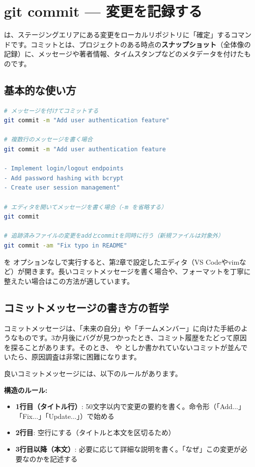 \section{git commit — 変更を記録する}

 は、ステージングエリアにある変更をローカルリポジトリに「確定」するコマンドです。コミットとは、プロジェクトのある時点の\textbf{スナップショット}（全体像の記録）に、メッセージや著者情報、タイムスタンプなどのメタデータを付けたものです。

\subsection{基本的な使い方}

\begin{lstlisting}[language=bash]
# メッセージを付けてコミットする
git commit -m "Add user authentication feature"

# 複数行のメッセージを書く場合
git commit -m "Add user authentication feature

- Implement login/logout endpoints
- Add password hashing with bcrypt
- Create user session management"

# エディタを開いてメッセージを書く場合（-m を省略する）
git commit

# 追跡済みファイルの変更をaddとcommitを同時に行う（新規ファイルは対象外）
git commit -am "Fix typo in README"
\end{lstlisting}

 を  オプションなしで実行すると、第2章で設定したエディタ（VS Codeやvimなど）が開きます。長いコミットメッセージを書く場合や、フォーマットを丁寧に整えたい場合はこの方法が適しています。

\subsection{コミットメッセージの書き方の哲学}

コミットメッセージは、「未来の自分」や「チームメンバー」に向けた手紙のようなものです。3か月後にバグが見つかったとき、コミット履歴をたどって原因を探ることがあります。そのとき、 や  としか書かれていないコミットが並んでいたら、原因調査は非常に困難になります。

良いコミットメッセージには、以下のルールがあります。

\textbf{構造のルール:}
\begin{itemize}
  \item \textbf{1行目（タイトル行）}: 50文字以内で変更の要約を書く。命令形（「Add...」「Fix...」「Update...」）で始める
  \item \textbf{2行目}: 空行にする（タイトルと本文を区切るため）
  \item \textbf{3行目以降（本文）}: 必要に応じて詳細な説明を書く。「なぜ」この変更が必要なのかを記述する
\end{itemize}

